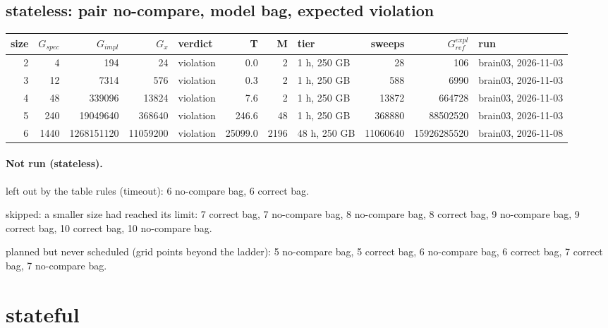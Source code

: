 \documentclass[10pt]{article}
\begin{document}
\subsection*{stateless: pair \textsf{no-compare}, model bag, expected violation}
\begin{longtable}{@{}rrrrlrrlrrl@{}}
\toprule
size & $G_{\mathit{spec}}$ & $G_{\mathit{impl}}$ & $G_x$ & verdict & T & M & tier & sweeps & $G_{\mathit{ref}}^{\mathit{expl}}$ & run \\
\midrule
\endhead
\color{blue} 2 & 4 & 194 & 24 & violation & 0.0 & 2 & 1 h, 250 GB & 28 & 106 & brain03, 2026-11-03 \\
\color{blue} 3 & 12 & 7314 & 576 & violation & 0.3 & 2 & 1 h, 250 GB & 588 & 6990 & brain03, 2026-11-03 \\
\color{blue} 4 & 48 & 339096 & 13824 & violation & 7.6 & 2 & 1 h, 250 GB & 13872 & 664728 & brain03, 2026-11-03 \\
\color{blue} 5 & 240 & 19049640 & 368640 & violation & 246.6 & 48 & 1 h, 250 GB & 368880 & 88502520 & brain03, 2026-11-03 \\
\color{blue} 6 & 1440 & 1268151120 & 11059200 & violation & 25099.0 & 2196 & 48 h, 250 GB & 11060640 & 15926285520 & brain03, 2026-11-08 \\
\bottomrule
\end{longtable}
\paragraph{Not run (stateless).}
left out by the table rules (timeout): 6 no-compare bag, 6 correct bag.\par
skipped: a smaller size had reached its limit: 7 correct bag, 7 no-compare bag, 8 no-compare bag, 8 correct bag, 9 no-compare bag, 9 correct bag, 10 correct bag, 10 no-compare bag.\par
planned but never scheduled (grid points beyond the ladder): 5 no-compare bag, 5 correct bag, 6 no-compare bag, 6 correct bag, 7 correct bag, 7 no-compare bag.\par
\section*{stateful}
\end{document}
